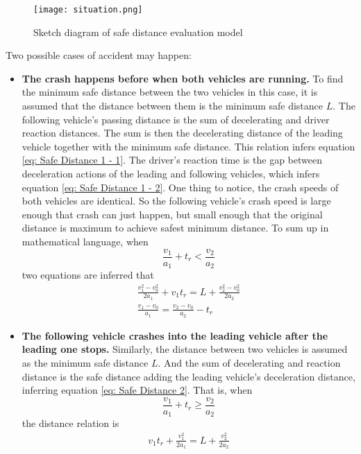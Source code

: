 \begin{figure}[h]
\label{fig: Safe distance model sketch}
\small
\centering
\texttt{[image: situation.png]}
\caption{Sketch diagram of safe distance evaluation model}
\end{figure}

Two possible cases of accident may happen:

\begin{itemize}

\item \textbf{The crash happens before when both vehicles 
are running.} To find the minimum safe distance between 
the two vehicles in this case, it is assumed that the 
distance between them is the minimum safe distance $ L $. 
The following vehicle's passing distance is the sum of 
decelerating and driver reaction distances. The sum is 
then the decelerating distance of the leading vehicle 
together with the minimum safe distance. This relation 
infers equation \ref{eq: Safe Distance 1 - 1}. The 
driver's reaction time is the gap between deceleration 
actions of the leading and following vehicles, which 
infers equation \ref{eq: Safe Distance 1 - 2}. One thing 
to notice, the crash speeds of both vehicles are identical. 
So the following vehicle's crash speed is large enough 
that crash can just happen, but small enough that the 
original distance is maximum to achieve safest minimum 
distance. To sum up in mathematical language, when
\begin{displaymath}
\frac{v_1}{a_1} + t_r < \frac{v_2}{a_2}
\end{displaymath}
two equations are inferred that 
\begin{eqnarray}
& \frac{v_1^2 - v_0 ^ 2}{2a_1} + v_1 t_r = L + \frac{
v_2 ^ 2 - v_0 ^ 2}{2a_2} &
\label{eq: Safe Distance 1 - 1}\\
& \frac{v_1 - v_0}{a_1} = \frac{v_2 - v_0}{a_2} - t_r &
\label{eq: Safe Distance 1 - 2}
\end{eqnarray}

\item \textbf{The following vehicle crashes into the 
leading vehicle after the leading one stops.} Similarly, 
the distance between two vehicles is assumed as the minimum 
safe distance $ L $. And the sum of decelerating and 
reaction distance is the safe distance adding the leading 
vehicle's deceleration distance, inferring equation 
\ref{eq: Safe Distance 2}. That is, when
\begin{displaymath}
\frac{v_1}{a_1} + t_r \geq \frac{v_2}{a_2}
\end{displaymath}
the distance relation is 
\begin{eqnarray}
& v_1 t_r + \frac{v_1 ^ 2}{2a_1} = L + \frac{v_2^2}{2a_2} &
\label{eq: Safe Distance 2}
\end{eqnarray}

\end{itemize}

